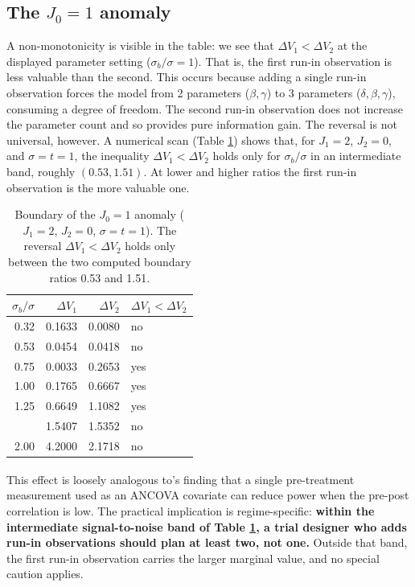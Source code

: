 \documentclass[
  11pt,
]{article}
\begin{document}
\subsection{\texorpdfstring{The \(J_0=1\) anomaly}{The J\_0=1 anomaly}}\label{the-j_01-anomaly}

A non-monotonicity is visible in the table: we see that
\(\Delta V_1 < \Delta V_2\) at the displayed parameter
setting (\(\sigma_b / \sigma = 1\)). That is, the first
run-in observation is less valuable than the second.
This occurs because adding a single run-in observation
forces the model from 2 parameters (\(\beta, \gamma\)) to
3 parameters (\(\delta, \beta, \gamma\)), consuming a
degree of freedom. The second run-in observation does
not increase the parameter count and so provides pure
information gain. The reversal is not universal,
however. A numerical scan (Table
\ref{tab:anomaly-boundary}) shows that, for \(J_1 = 2\),
\(J_2 = 0\), and \(\sigma = t = 1\), the inequality
\(\Delta V_1 < \Delta V_2\) holds only for
\(\sigma_b / \sigma\) in an intermediate band, roughly
\((0.53, 1.51)\). At lower and higher ratios the first
run-in observation is the more valuable one.

\begin{table}

\caption{\label{tab:anomaly-boundary}Boundary of the $J_0 = 1$ anomaly ($J_1 = 2$, $J_2 = 0$, $\sigma = t = 1$). The reversal $\Delta V_1 < \Delta V_2$ holds only between the two computed boundary ratios 0.53 and 1.51.}
\centering
\begin{tabular}[t]{rrrl}
\toprule
$\sigma_b/\sigma$ & $\Delta V_1$ & $\Delta V_2$ & $\Delta V_1 < \Delta V_2$\\
\midrule
0.32 & 0.1633 & 0.0080 & no\\
0.53 & 0.0454 & 0.0418 & no\\
0.75 & 0.0033 & 0.2653 & yes\\
1.00 & 0.1765 & 0.6667 & yes\\
1.25 & 0.6649 & 1.1082 & yes\\
\addlinespace
1.51 & 1.5407 & 1.5352 & no\\
2.00 & 4.2000 & 2.1718 & no\\
\bottomrule
\end{tabular}
\end{table}

This effect is loosely analogous to\textsuperscript{}'s
finding that a single pre-treatment measurement used as
an ANCOVA covariate can reduce power when the pre-post
correlation is low. The practical implication is
regime-specific: \textbf{within the intermediate
signal-to-noise band of Table
\ref{tab:anomaly-boundary}, a trial designer who adds
run-in observations should plan at least two, not one.}
Outside that band, the first run-in observation carries
the larger marginal value, and no special caution
applies.
\end{document}
